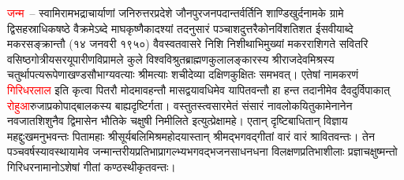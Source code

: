 \begin{sloppypar}\justifying\noindent\hspace{10mm} \textcolor{red}{जन्म}~– स्वामि\-रामभद्राचार्याणां जनिरुत्तरप्रदेशे जौनपुर\-जनपदान्तर्वर्तिनि शाण्डिखुर्द\-नामके ग्रामे द्विसहस्राधिक\-षष्ठे वैक्रमेऽब्दे माघकृष्णैकादश्यां तदनुसारं पञ्चाशदुत्तरैकोन\-विंशतिशत ईसवीयाब्दे मकर\-सङ्क्रान्तौ (१४ जनवरी १९५०) वैवस्वत\-वासरे निशि निशीथाभिमुख्यां 
मकरराशिगते सवितरि वसिष्ठ\-गोत्रीय\-सरयूपारीण\-विप्रामले कुले विश्व\-विश्रुत\-ब्राह्मण\-कुलालङ्कारस्य श्रीराजदेव\-मिश्रस्य चतुर्थापत्य\-रूपेणाखण्ड\-सौभाग्य\-वत्याः श्रीमत्याः शची\-देव्या दक्षिण\-कुक्षितः समभवत्। एतेषां नामकरणं \textcolor{red}{गिरिधरलाल} इति कृत्वा पितरौ मोदमावहन्तौ मासद्वयावधिमेव यापितवन्तौ हा हन्त तदानीमेव 
दैवदुर्विपाकात् \textcolor{red}{रोहुआ}\-रुजा\-प्रकोपाद्बालकस्य बाह्यदृष्टिर्गता। वस्तुतस्त्वसारमेतं संसारं नावलोकयितु\-कामेनानेन नवजात\-शिशुनैव द्विमासेन भौतिके चक्षुषी निमीलिते इत्युत्प्रेक्षामहे। एतान् दृष्टि\-बाधितान् विज्ञाय महद्दुःखमनुभवन्तः पितामहाः श्रीसूर्यबलि\-मिश्र\-महोदयास्तान् श्रीमद्भगवद्गीतां वारं वारं श्रावितवन्तः। तेन पञ्चवर्षस्यावस्थायामेव जन्मान्तरीय\-प्रतिभा\-प्रागल्भ्य\-भगवद्भजन\-साधन\-धना विलक्षण\-प्रतिभाशीलाः प्रज्ञाचक्षुष्मन्तो गिरिधरनामानोऽशेषां गीतां कण्ठस्थीकृतवन्तः।\end{sloppypar}
